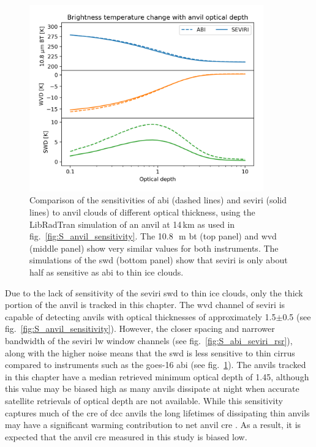 \begin{figure}[tp]
    \centering
    \includegraphics[width=0.9\textwidth]{figures/chapter4_06.png}
    \caption[
    Comparison of the sensitivities of \acrshort{abi} (dashed lines) and \acrshort{seviri} (solid lines) to anvil clouds of different optical thickness
    ]{
    Comparison of the sensitivities of \acrshort{abi} (dashed lines) and \acrshort{seviri} (solid lines) to anvil clouds of different optical thickness, using the LibRadTran simulation of an anvil at 14\,\unit{km} as used in fig.~\ref{fig:S_anvil_sensitivity}. The 10.8\,\unit{\mu m} \acrshort{bt} (top panel) and \acrshort{wvd} (middle panel) show very similar values for both instruments. The simulations of the \acrshort{swd} (bottom panel) show that \acrshort{seviri} is only about half as sensitive as \acrshort{abi} to thin ice clouds.
    }
    \label{fig:S_abi_seviri_anvil_sensitivity}
\end{figure}


Due to the lack of sensitivity of the \acrshort{seviri} \acrshort{swd} to thin ice clouds, only the thick portion of the anvil is tracked in this chapter.
The \acrshort{wvd} channel of \acrshort{seviri} is capable of detecting anvils with optical thicknesses of approximately 1.5$\pm$0.5 (see fig.~\ref{fig:S_anvil_sensitivity}).
However, the closer spacing and narrower bandwidth of the \acrshort{seviri} \acrshort{lw} window channels (see fig.~\ref{fig:S_abi_seviri_rsr}), along with the higher noise means that the \acrshort{swd} is less sensitive to thin cirrus compared to instruments such as the \acrshort{goes}-16 \acrshort{abi} (see fig.~\ref{fig:S_abi_seviri_anvil_sensitivity}).
The anvils tracked in this chapter have a median retrieved minimum optical depth of 1.45, although this value may be biased high as many anvils dissipate at night when accurate satellite retrievals of optical depth are not available.
While this sensitivity captures much of the \acrshort{cre} of \acrshort{dcc} anvils \citep{berry_cloud_2014} the long lifetimes of dissipating thin anvils may have a significant warming contribution to net anvil \acrshort{cre} \citep{horner_evolution_2023}.
As a result, it is expected that the anvil \acrshort{cre} measured in this study is biased low.

